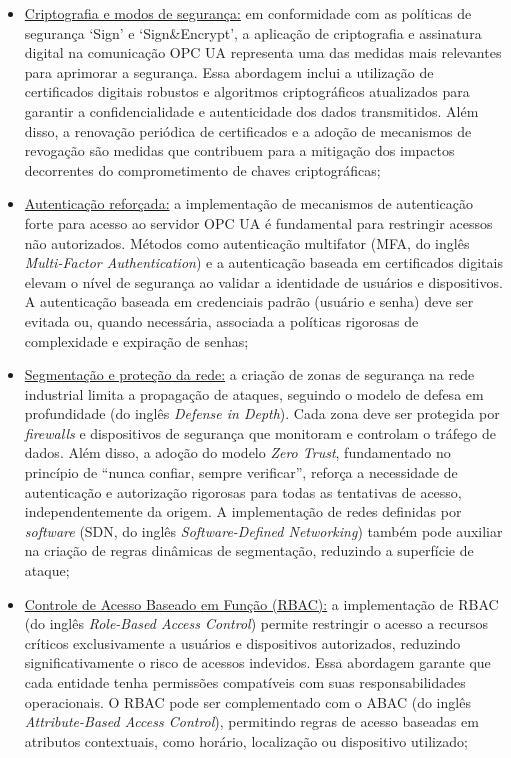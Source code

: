         \begin{itemize}
            \item \underline{Criptografia e modos de segurança:} em conformidade com as políticas de segurança `Sign' e `Sign\&Encrypt', a aplicação de criptografia e assinatura digital na comunicação OPC UA representa uma das medidas mais relevantes para aprimorar a segurança. Essa abordagem inclui a utilização de certificados digitais robustos e algoritmos criptográficos atualizados para garantir a confidencialidade e autenticidade dos dados transmitidos. Além disso, a renovação periódica de certificados e a adoção de mecanismos de revogação são medidas que contribuem para a mitigação dos impactos decorrentes do comprometimento de chaves criptográficas;
            \item \underline{Autenticação reforçada:} a implementação de mecanismos de autenticação forte para acesso ao servidor OPC UA é fundamental para restringir acessos não autorizados. Métodos como autenticação multifator (MFA, do inglês \textit{Multi-Factor Authentication}) e a autenticação baseada em certificados digitais elevam o nível de segurança ao validar a identidade de usuários e dispositivos. A autenticação baseada em credenciais padrão (usuário e senha) deve ser evitada ou, quando necessária, associada a políticas rigorosas de complexidade e expiração de senhas;
            \item \underline{Segmentação e proteção da rede:} a criação de zonas de segurança na rede industrial limita a propagação de ataques, seguindo o modelo de defesa em profundidade (do inglês \textit{Defense in Depth}). Cada zona deve ser protegida por \textit{firewalls} e dispositivos de segurança que monitoram e controlam o tráfego de dados. Além disso, a adoção do modelo \textit{Zero Trust}, fundamentado no princípio de ``nunca confiar, sempre verificar'', reforça a necessidade de autenticação e autorização rigorosas para todas as tentativas de acesso, independentemente da origem. A implementação de redes definidas por \textit{software} (SDN, do inglês \textit{Software-Defined Networking}) também pode auxiliar na criação de regras dinâmicas de segmentação, reduzindo a superfície de ataque;
            \item \underline{Controle de Acesso Baseado em Função (RBAC):} a implementação de RBAC (do inglês \textit{Role-Based Access Control}) permite restringir o acesso a recursos críticos exclusivamente a usuários e dispositivos autorizados, reduzindo significativamente o risco de acessos indevidos. Essa abordagem garante que cada entidade tenha permissões compatíveis com suas responsabilidades operacionais. O RBAC pode ser complementado com o ABAC (do inglês \textit{Attribute-Based Access Control}), permitindo regras de acesso baseadas em atributos contextuais, como horário, localização ou dispositivo utilizado;

\end{itemize}
